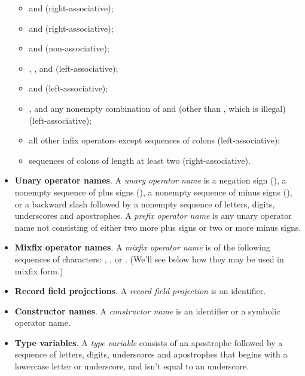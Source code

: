 \begin{itemize}
\begin{itemize}
  \item \ecn{||} and \ecn{\\/} (right-associative);

  \item \ecn{&&} and \ecn{/\\} (right-associative);

  \item \ecn{=} and \ecn{<>} (non-associative);

  \item \ecn{<}, \ecn{>}, \ecn{<=} and \ecn{>=}
    (left-associative);

  \item \ecn{-} and \ecn{+} (left-associative);

  \item \ecn{*}, and any nonempty combination of \ecn{/} and
    \ecn{\%} (other than \ecn{//}, which is illegal)
    (left-associative);

  \item all other infix operators except sequences of colons
    (left-associative);

  \item sequences of colons of length at least two (right-associative).
  \end{itemize}

\item \textbf{Unary operator names}. A \emph{unary operator name} is a
  negation sign (\ec{!}), a nonempty sequence of plus signs (\ec{+}),
  a nonempty sequence of minus signs (\ec{-}), or a backward slash
  followed by a nonempty sequence of letters, digits, underscores and
  apostrophes.  A \emph{prefix operator name} is any unary operator
  name not consisting of either two more plus signs or two or more
  minus signs.

\item \textbf{Mixfix operator names}. A \emph{mixfix operator name} is
  of the following sequences of characters: , \ec{[]},
   or .  (We'll see below how they may be used
  in mixfix form.)

\item \textbf{Record field projections}. A \emph{record field
    projection} is an identifier.

\item \textbf{Constructor names}. A \emph{constructor name} is an identifier
  or a symbolic operator name.

\item \textbf{Type variables}. A \emph{type variable} consists of an
  apostrophe followed by a sequence of letters, digits, underscores
  and apostrophes that begins with a lowercase letter or underscore,
  and isn't equal to an underscore.


\end{itemize}
